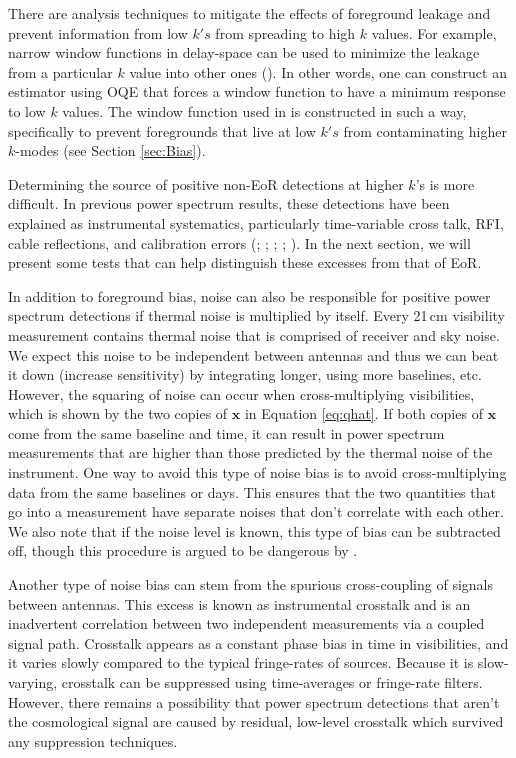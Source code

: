 \documentclass[preprint2,numberedappendix,tighten]{aastex6}  %
\begin{document}
There are analysis techniques to mitigate the effects of foreground leakage and prevent information from low $k's$ from 
spreading to high $k$ values. For example, narrow window functions in delay-space can be used to minimize the leakage from a particular 
$k$ value into other ones (\citealt{liu_et_al2014b}). In other words, one can construct an estimator using OQE that forces a 
window function to have a minimum response to low $k$ values. The window function used in  is constructed in such a way, 
specifically to prevent foregrounds that live at low $k's$ from contaminating higher $k$-modes (see Section \ref{sec:Bias}). 

Determining the source of positive non-EoR detections at higher $k$'s is more difficult. In previous power spectrum results, these detections have been explained as instrumental systematics, particularly time-variable cross talk, RFI, cable reflections, and calibration errors (; \citealt{parsons_et_al2014}; \citealt{dillon_et_al2014}; \citealt{beardsley_et_al2016}; \citealt{patil_et_al2017}). In the next section, we will present some tests that can help distinguish these excesses from that of EoR. 

In addition to foreground bias, noise can also be responsible for positive power spectrum detections if thermal noise is 
multiplied by itself. Every 21\,cm visibility measurement contains thermal noise that is comprised of receiver and sky noise. 
We expect this noise to be independent between antennas and thus we can beat it down (increase sensitivity) by integrating 
longer, using more baselines, etc. However, the squaring of noise can occur when cross-multiplying visibilities, which is shown by 
the two copies of $\textbf{x}$ in Equation \eqref{eq:qhat}. If both copies of $\textbf{x}$ come from the same baseline and time, it 
can result in power spectrum measurements that are higher than those predicted by the thermal noise of the instrument. One 
way to avoid this type of noise bias is to avoid cross-multiplying data from the same baselines or days. This ensures that the 
two quantities that go into a measurement have separate noises that don't correlate with each other. We also note that if the noise level is known, this type of bias can be subtracted off, though this procedure is argued to be dangerous by \citet{dillon_et_al2014}.

Another type of noise bias can stem from the spurious cross-coupling of signals between antennas. This excess is known as 
instrumental crosstalk and is an inadvertent correlation between two independent measurements via a coupled signal path. 
Crosstalk appears as a constant phase bias in time in visibilities, and it varies slowly compared to the typical fringe-rates of 
sources. Because it is slow-varying, crosstalk can be suppressed using time-averages or fringe-rate filters. However, there 
remains a possibility that power spectrum detections that aren't the cosmological signal are caused by residual, low-level crosstalk which survived any 
suppression techniques. 
\end{document}
